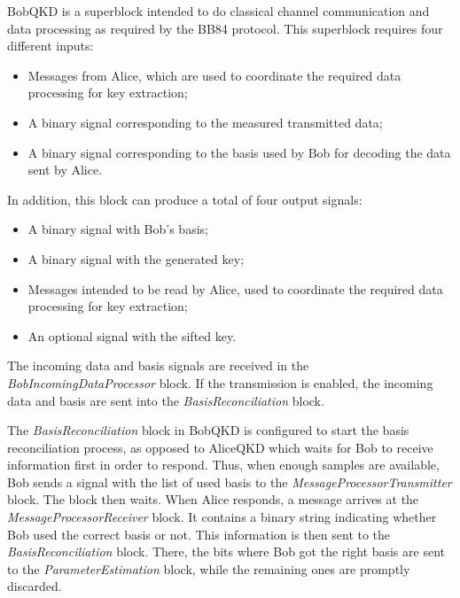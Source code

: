 BobQKD is a superblock intended to do classical channel communication and 
data processing  as required by the BB84 protocol. This superblock requires 
four different inputs:

\begin{itemize}
	\item Messages from Alice, which are used to coordinate the required data 
	processing for key extraction;
	\item A binary signal corresponding to the measured transmitted data;
	\item A binary signal corresponding to the basis used by Bob for 
	decoding the data sent by Alice.
\end{itemize}

In addition, this block can produce a total of four output signals:

\begin{itemize}
	\item A binary signal with Bob's basis;
	\item A binary signal with the generated key;
	\item Messages intended to be read by Alice, used to coordinate the required 
	data processing for key extraction;
	\item An optional signal with the sifted key.
\end{itemize}


The incoming data and basis signals are received in the 
\textit{BobIncomingDataProcessor} block. If the transmission is enabled, the 
incoming data and basis are sent into the \textit{BasisReconciliation} block.

The \textit{BasisReconciliation} block in BobQKD is configured to start the
basis reconciliation process, as opposed to AliceQKD which waits for Bob to
receive information first in order to respond. Thus, when enough samples are available, Bob
sends a signal with the list of used basis to the 
\textit{MessageProcessorTransmitter} block. The block then waits.
When Alice responds, a message arrives at the \textit{MessageProcessorReceiver} 
block. It contains a binary string indicating whether Bob used the correct 
basis or not. This information is then sent to the \textit{BasisReconciliation} 
block. There, the bits where Bob got the right basis are sent to the 
\textit{ParameterEstimation} block, while the remaining ones are promptly discarded.

